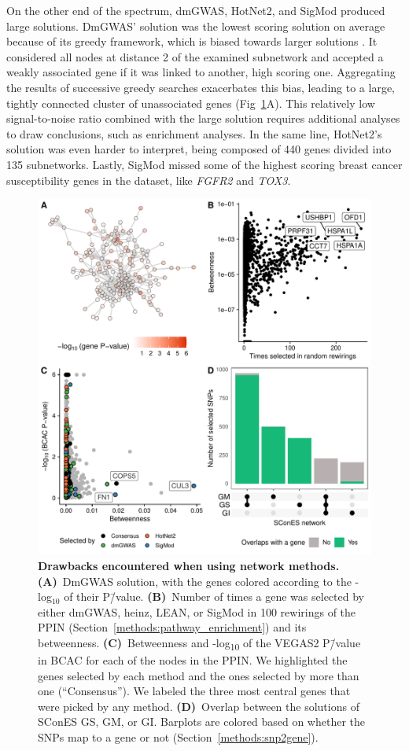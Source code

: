 \documentclass[10pt,letterpaper]{article}
\begin{document}
On the other end of the spectrum, dmGWAS, HotNet2, and SigMod produced large solutions. DmGWAS' solution was the lowest scoring solution on average because of its greedy framework, which is biased towards larger solutions \cite{nikolayeva_network_2018}. It considered all nodes at distance 2 of the examined subnetwork and accepted a weakly associated gene if it was linked to another, high scoring one. Aggregating the results of successive greedy searches exacerbates this bias, leading to a large, tightly connected cluster of unassociated genes (Fig~\ref{fig:issues}A). This relatively low signal-to-noise ratio combined with the large solution requires additional analyses to draw conclusions, such as enrichment analyses. In the same line, HotNet2's solution was even harder to interpret, being composed of 440 genes divided into 135 subnetworks. Lastly, SigMod missed some of the highest scoring breast cancer susceptibility genes in the dataset, like \emph{FGFR2} and \emph{TOX3}.

\begin{figure}[!ht]
  \centering
  \includegraphics[width=.8\linewidth]{./figures/figure_4.pdf}
  \caption{\textbf{Drawbacks encountered when using network methods.} \textbf{(A)}~DmGWAS solution, with the genes colored according to the -log$_{10}$ of their P\=/value. \textbf{(B)}~Number of times a gene was selected by either dmGWAS, heinz, LEAN, or SigMod in 100 rewirings of the PPIN (Section~\ref{methods:pathway_enrichment}) and its betweenness. \textbf{(C)}~Betweenness and -log\textsubscript{10} of the VEGAS2 P\=/value in BCAC for each of the nodes in the PPIN. We highlighted the genes selected by each method and the ones selected by more than one (``Consensus''). We labeled the three most central genes that were picked by any method. \textbf{(D)}~Overlap between the solutions of SConES GS, GM, or GI. Barplots are colored based on whether the SNPs map to a gene or not (Section~\ref{methods:snp2gene}).}
  \label{fig:issues}
  \end{figure}
\end{document}
